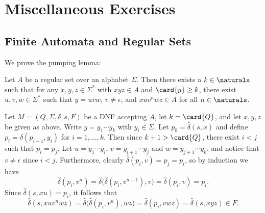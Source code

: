\documentclass[article, a4paper, 11pt, oneside]{memoir}
\title{\doctitle}
\author{\docauthor}
\numberwithin{equation}{chapter}
\theoremstyle{nonumberplain}
\newenvironment{displaytheorem}{%
	\begin{displayquote}\itshape%
}{%
	\end{displayquote}%
}
\theoremstyle{myexample}
\theoremstyle{myexamplebreak}
\begin{document}
\maketitle

\setcounter{secnumdepth}{-2}
\chapter{Miscellaneous Exercises}

\section{Finite Automata and Regular Sets}

\newcommand{\calL}{\mathcal{L}}

\begin{remarkbreak}
    We prove the pumping lemma:
    \begin{displaytheorem}
        Let $A$ be a regular set over an alphabet $\Sigma$. Then there exists a $k \in \naturals$ such that for any $x,y,z \in \Sigma^*$ with $xyz \in A$ and $\card{y} \geq k$, there exist $u,v,w \in \Sigma^*$ such that $y = uvw$, $v \neq \epsilon$, and $xuv^n wz \in A$ for all $n \in \naturals$.
    \end{displaytheorem}
    Let $M = (Q, \Sigma, \delta, s, F)$ be a DNF accepting $A$, let $k = \card{Q}$, and let $x,y,z$ be given as above. Write $y = y_1 \cdots y_k$ with $y_i \in \Sigma$. Let $p_0 = \hat\delta(s,x)$ and define $p_i = \delta(p_{i-1},y_i)$ for $i = 1, \ldots, k$. Then since $k+1 > \card{Q}$, there exist $i < j$ such that $p_i = p_j$. Let $u = y_1 \cdots y_i$, $v = y_{i+1} \cdots y_j$ and $w = y_{j+1} \cdots y_k$, and notice that $v \neq \epsilon$ since $i < j$. Furthermore, clearly $\hat\delta(p_i,v) = p_j = p_i$, so by induction we have
    \begin{equation*}
        \hat\delta(p_i, v^n)
            = \hat\delta \bigl( \hat\delta(p_i, v^{n-1}), v \bigr)
            = \hat\delta(p_i, v)
            = p_i.
    \end{equation*}
    Since $\hat\delta(s,xu) = p_i$, it follows that
    \begin{equation*}
        \hat\delta(s,xuv^n wz)
            = \hat\delta \bigl( \hat\delta(p_i, v^n), wz \bigr)
            = \hat\delta(p_i, vwz)
            = \hat\delta(s, xyz)
            \in F.
    \end{equation*}
\end{remarkbreak}
\end{document}
